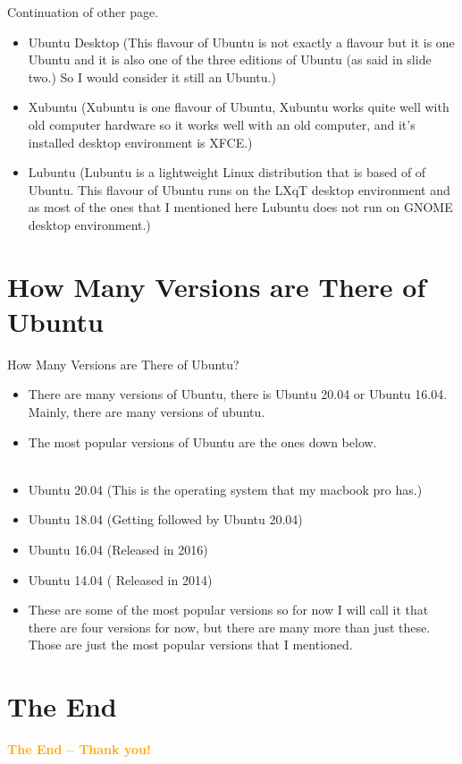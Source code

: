 \documentclass[aspectratio=43]{beamer}
\begin{document}
	
\begin{frame}{Continuation of other page.}
\begin{block}{}
\begin{itemize}

\item Ubuntu Desktop (This flavour of Ubuntu is not exactly a flavour but it is one Ubuntu and it is also one of the three editions of Ubuntu (as said in slide two.) So I would consider it still an Ubuntu.)
\item Xubuntu (Xubuntu is one flavour of Ubuntu, Xubuntu works quite well with old computer hardware so it works well with an old computer, and it's installed desktop environment is XFCE.)
\item Lubuntu (Lubuntu is a lightweight Linux distribution that is based of of Ubuntu. This flavour of Ubuntu runs on the LXqT desktop environment and as most of the ones that I mentioned here Lubuntu does not run on GNOME desktop environment.)

\end{itemize}
\end{block}
\end{frame}


\section{How Many Versions are There of Ubuntu}
\begin{frame}{How Many Versions are There of Ubuntu?}
\begin{itemize}
\item There are many versions of Ubuntu, there is Ubuntu 20.04 or Ubuntu 16.04. Mainly, there are many versions of ubuntu.
\item The most popular versions of Ubuntu are the ones down below.
\\
~\\
\item Ubuntu 20.04 (This is the operating system that my macbook pro has.)
\item Ubuntu 18.04 (Getting followed by Ubuntu 20.04)
\item Ubuntu 16.04 (Released in 2016)
\item Ubuntu 14.04 ( Released in 2014)
\item These are some of the most popular versions so for now I will call it that there are four versions for now, but there are many more than just these. Those are just the most popular versions that I mentioned. 
\end{itemize}

 


\end{frame}


	
\section{The End}
    \begin{frame}{ }
        \centering
            \Huge\bfseries
        \textcolor{orange}{The End -- Thank you!}
    \end{frame}
\end{document}
